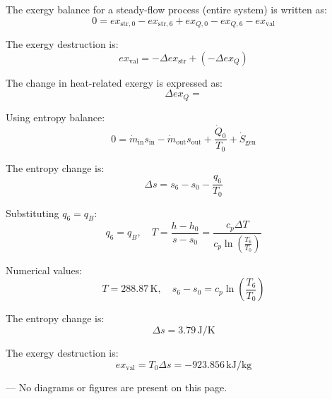 The exergy balance for a steady-flow process (entire system) is written as:  
\[
0 = ex_{\text{str},0} - ex_{\text{str},6} + ex_{Q,0} - ex_{Q,6} - ex_{\text{val}}
\]  

The exergy destruction is:  
\[
ex_{\text{val}} = -\Delta ex_{\text{str}} + (-\Delta ex_Q)
\]  

The change in heat-related exergy is expressed as:  
\[
\Delta ex_Q = 
\]  

Using entropy balance:  
\[
0 = \dot{m}_{\text{in}} s_{\text{in}} - \dot{m}_{\text{out}} s_{\text{out}} + \frac{\dot{Q}_0}{T_0} + \dot{S}_{\text{gen}}
\]  

The entropy change is:  
\[
\Delta s = s_6 - s_0 - \frac{q_6}{T_0}
\]  

Substituting \( q_6 = q_B \):  
\[
q_6 = q_B, \quad T = \frac{h - h_0}{s - s_0} = \frac{c_p \Delta T}{c_p \ln\left(\frac{T_6}{T_0}\right)}
\]  

Numerical values:  
\[
T = 288.87 \, \text{K}, \quad s_6 - s_0 = c_p \ln\left(\frac{T_6}{T_0}\right)
\]  

The entropy change is:  
\[
\Delta s = 3.79 \, \text{J/K}
\]  

The exergy destruction is:  
\[
ex_{\text{val}} = T_0 \Delta s = -923.856 \, \text{kJ/kg}
\]  

---  
No diagrams or figures are present on this page.
